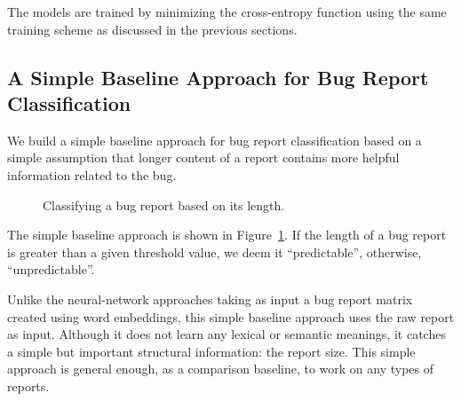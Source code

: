 The models are trained by minimizing the cross-entropy function using the same training scheme as discussed in the previous sections.

\subsection{A Simple Baseline Approach for Bug Report Classification}
\label{sec:simple baseline}
We build a simple baseline approach for bug report classification based on a simple assumption that longer content of a report contains more helpful information related to the bug.

\begin{figure}[ht]
\begin{center}
\caption{Classifying a bug report based on its length.}
\label{fig:simple baseline}
\end{center}
\end{figure}

The simple baseline approach is shown in Figure~\ref{fig:simple baseline}. If the length of a bug report is greater than a given threshold value, we deem it ``predictable'', otherwise, ``unpredictable''.

Unlike the neural-network approaches taking as input a bug report matrix created using word embeddings, this simple baseline approach uses the raw report as input. Although it does not learn any lexical or semantic meanings, it catches a simple but important structural information: the report size. This simple approach is general enough, as a comparison baseline, to work on any types of reports.


